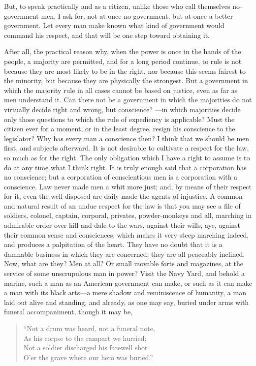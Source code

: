 \documentclass[letterpaper,12pt]{article}
\begin{document}
But, to speak practically and as a citizen, unlike those who call themselves
no-government men, I ask for, not at once no government, but at once a better
government. Let every man make known what kind of government would command his
respect, and that will be one step toward obtaining it.

After all, the practical reason why, when the power is once in the hands of the
people, a majority are permitted, and for a long period continue, to rule is not
because they are most likely to be in the right, nor because this seems fairest
to the minority, but because they are physically the strongest. But a government
in which the majority rule in all cases cannot be based on justice, even as far
as men understand it. Can there not be a government in which the majorities do
not virtually decide right and wrong, but conscience? ---in which majorities
decide only those questions to which the rule of expediency is applicable? Must
the citizen ever for a moment, or in the least degree, resign his conscience to
the legislator? Why has every man a conscience then? I think that we should be
men first, and subjects afterward. It is not desirable to cultivate a respect
for the law, so much as for the right. The only obligation which I have a right
to assume is to do at any time what I think right. It is truly enough said that
a corporation has no conscience; but a corporation of conscientious men is
a corporation with a conscience. Law never made men a whit more just; and, by
means of their respect for it, even the well-disposed are daily made the agents
of injustice. A common and natural result of an undue respect for the law is
that you may see a file of soldiers, colonel, captain, corporal, privates,
powder-monkeys and all, marching in admirable order over hill and dale to the
wars, against their wills, aye, against their common sense and consciences,
which makes it very steep marching indeed, and produces a palpitation of the
heart. They have no doubt that it is a damnable business in which they are
concerned; they are all peaceably inclined. Now, what are they? Men at all? Or
small movable forts and magazines, at the service of some unscrupulous man in
power? Visit the Navy Yard, and behold a marine, such a man as an American
government can make, or such as it can make a man with its black arts---a mere
shadow and reminiscence of humanity, a man laid out alive and standing, and
already, as one may say, buried under arms with funeral accompaniment, though it
may be,

\begin{verse}
    \enquote{Not a drum was heard, not a funeral note, \\
        As his corpse to the rampart we hurried; \\
        Not a soldier discharged his farewell shot \\
        O'er the grave where our hero was buried.}
\end{verse}
\end{document}
